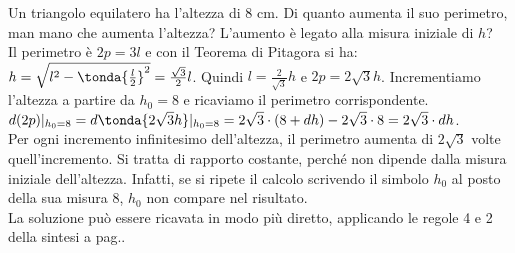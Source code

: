 \begin{esempio}
Un triangolo equilatero ha l'altezza di $8$ cm. 
Di quanto aumenta il suo perimetro, man mano che aumenta l'altezza? 
L'aumento è legato alla misura iniziale di $h$?\\
Il perimetro è $2p=3l$ e con il Teorema di Pitagora si ha: 
$h=\sqrt{l^2-\tonda{\frac{l}{2}}^2}=\frac{\sqrt{3}}{2}l$. 
Quindi $l=\frac{2}{\sqrt{3}}h$ e $2p=2\sqrt{3}h$. 
Incrementiamo l'altezza a partire da $h_0=8$ e ricaviamo il perimetro 
corrispondente.\\
$d(2p)|_{h_0=8}=
d\tonda{2\sqrt{3}h}|_{h_0=8}=
2 \sqrt{3} \cdot (8+dh)-2\sqrt{3} \cdot 8 = 2 \sqrt{3} \cdot dh$.\\
Per ogni incremento infinitesimo dell'altezza, il perimetro aumenta di 
$2 \sqrt{3}$ volte quell'incremento.
Si tratta di rapporto costante, perché non dipende dalla misura iniziale
dell'altezza. Infatti, se si ripete il calcolo scrivendo il simbolo $h_0$ al 
posto della sua misura $8$, $h_0$ non compare nel risultato.\\
La soluzione può essere ricavata in modo più diretto, applicando le regole
4 e 2 della sintesi a pag.\pageref{subsubsec:diff01_diffsint}.
\end{esempio}

